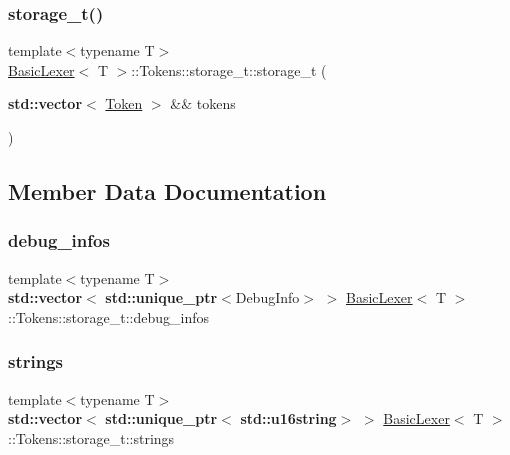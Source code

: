 \subsubsection{\texorpdfstring{storage\+\_\+t()}{storage\_t()}\hspace{0.1cm}{\footnotesize\ttfamily [2/2]}}
{\footnotesize\ttfamily template$<$typename T$>$ \\
\hyperlink{class_basic_lexer}{Basic\+Lexer}$<$ T $>$\+::Tokens\+::storage\+\_\+t\+::storage\+\_\+t (\begin{DoxyParamCaption}\item[{\textbf{ std\+::vector}$<$ \hyperlink{class_token}{Token} $>$ \&\&}]{tokens }\end{DoxyParamCaption})\hspace{0.3cm}{\ttfamily [inline]}}



\subsection{Member Data Documentation}
\mbox{\label{struct_basic_lexer_1_1_tokens_1_1storage__t_ae3ce5c349aac790b12113d269d974f34}} 
\subsubsection{\texorpdfstring{debug\+\_\+infos}{debug\_infos}}
{\footnotesize\ttfamily template$<$typename T$>$ \\
\textbf{ std\+::vector}$<$\textbf{ std\+::unique\+\_\+ptr}$<$Debug\+Info$>$ $>$ \hyperlink{class_basic_lexer}{Basic\+Lexer}$<$ T $>$\+::Tokens\+::storage\+\_\+t\+::debug\+\_\+infos}

\mbox{\label{struct_basic_lexer_1_1_tokens_1_1storage__t_aab6e51d3081a09fbfae5e6d830d0a02d}} 
\subsubsection{\texorpdfstring{strings}{strings}}
{\footnotesize\ttfamily template$<$typename T$>$ \\
\textbf{ std\+::vector}$<$\textbf{ std\+::unique\+\_\+ptr}$<$\textbf{ std\+::u16string}$>$ $>$ \hyperlink{class_basic_lexer}{Basic\+Lexer}$<$ T $>$\+::Tokens\+::storage\+\_\+t\+::strings}

